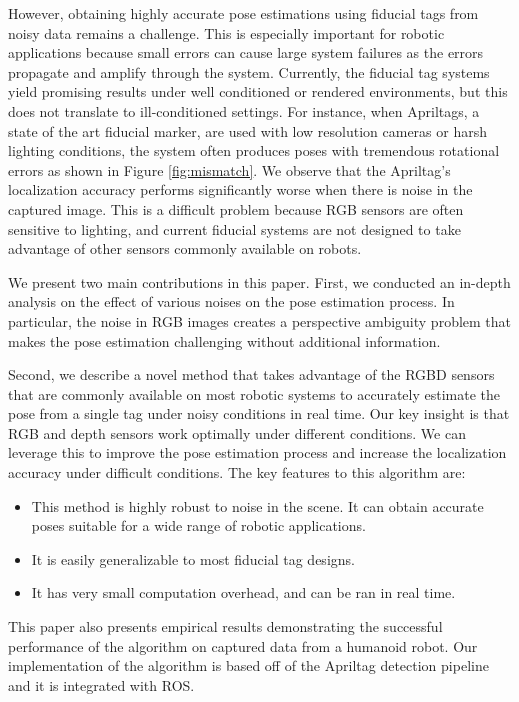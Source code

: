 However, obtaining highly accurate pose estimations using fiducial tags from noisy data remains a challenge. This is especially important for robotic applications because small errors can cause large system failures as the errors propagate and amplify through the system. Currently, the fiducial tag systems yield promising results under well conditioned or rendered environments, but this does not translate to ill-conditioned settings. For instance, when Apriltags, a state of the art fiducial marker, are used with low resolution cameras or harsh lighting conditions, the system often produces poses with tremendous rotational errors as shown in Figure \ref{fig:mismatch}. We observe that the Apriltag's localization accuracy performs significantly worse when there is noise in the captured image. This is a difficult problem because RGB sensors are often sensitive to lighting, and current fiducial systems are not designed to take advantage of other sensors commonly available on robots.

We present two main contributions in this paper. First, we conducted an in-depth analysis on the effect of various noises on the pose estimation process. In particular, the noise in RGB images creates a perspective ambiguity problem that makes the pose estimation challenging without additional information. 

Second, we describe a novel method that takes advantage of the RGBD sensors that are commonly available on most robotic systems to accurately estimate the pose from a single tag under noisy conditions in real time. Our key insight is that RGB and depth sensors work optimally under different conditions. We can leverage this to improve the pose estimation process and increase the localization accuracy under difficult conditions. The key features to this algorithm are: 
\begin{itemize}
\item This method is highly robust to noise in the scene. It can obtain accurate poses suitable for a wide range of robotic applications.   
\item It is easily generalizable to most fiducial tag designs.
\item It has very small computation overhead, and can be ran in real time. 
\end{itemize}

This paper also presents empirical results demonstrating the successful performance of the algorithm on captured data from a humanoid robot. Our implementation of the algorithm is based off of the Apriltag detection pipeline and it is integrated with ROS. 